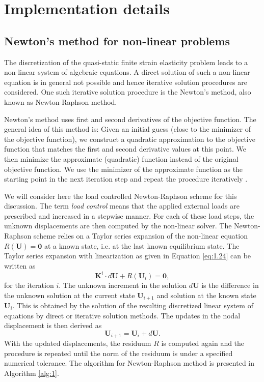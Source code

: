\documentclass[11pt,a4paper,final]{article}
\begin{document}
\section{Implementation details}

\subsection{Newton's method for non-linear problems}
The discretization of the quasi-static finite strain elasticity problem leads to a non-linear system of algebraic equations. A direct solution of such a non-linear equation is in general not possible and hence iterative solution procedures are considered. One such iterative solution procedure is the Newton's method, also known as Newton-Raphson method. \par 

Newton's method uses first and second derivatives of the objective function. The general idea of this method is: Given an initial guess (close to the minimizer of the objective function), we construct a quadratic approximation to the objective function that matches the first and second derivative values at this point. We then minimize the approximate (quadratic) function instead of the original objective function. We use the minimizer of the approximate function as the starting point in the next iteration step and repeat the procedure iteratively \cite{EdwinK.P.Chong2013}. \par

We will consider here the load controlled Newton-Raphson scheme for this discussion. The term \textit{load control} means that the applied external loads are prescribed and increased in a stepwise manner. For each of these load steps, the unknown displacements are then computed by the non-linear solver. The Newton-Raphson scheme relies on a Taylor series expansion of the non-linear equation $R (\mathbf{U}) = \bm{0}$ at a known state, i.e. at the last known equilibrium state. The Taylor series expansion with linearization as given in Equation \eqref{eq:1.24} can be written as 
\begin{equation}
\mathbf{K}^i \cdot d\mathbf{U} + R(\mathbf{U}_i) = \bm{0},
\end{equation}
for the iteration $i$. The unknown increment in the solution $d\mathbf{U}$ is the difference in the unknown solution at the current state $\mathbf{U}_{i+1}$ and solution at the known state $\mathbf{U}_i$. This is obtained by the solution of the resulting discretized linear system of equations by direct or iterative solution methods. The updates in the nodal displacement is then derived as 
\begin{equation}
\mathbf{U}_{i+1} = \mathbf{U}_i + d\mathbf{U}.
\end{equation}
With the updated displacements, the residuum $R$ is computed again and the procedure is repeated until the norm of the residuum is under a specified numerical tolerance. The algorithm for Newton-Raphson method is presented in Algorithm \eqref{alg:1}.
\end{document}
